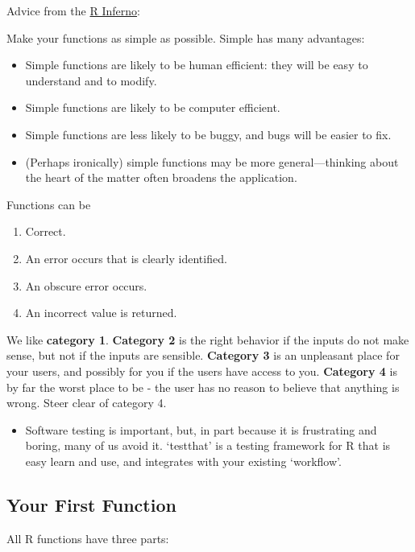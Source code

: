 \documentclass[]{book}
\providecommand{\tightlist}{%
  \setlength{\itemsep}{0pt}\setlength{\parskip}{0pt}}
\newenvironment{rmdblock}[1]
  {\begin{shaded*}
  \begin{itemize}
  \renewcommand{\labelitemi}{
    \raisebox{-.7\height}[0pt][0pt]{
      {\setkeys{Gin}{width=3em,keepaspectratio}\texttt{[image: images/\#1]}}
    }
  }
  \item
  }
  {
  \end{itemize}
  \end{shaded*}
  }
\newenvironment{rmdimportant}
  {\begin{rmdblock}{important}}
  {\end{rmdblock}}
\begin{document}
Advice from the
\href{http://www.burns-stat.com/pages/Tutor/R_inferno.pdf}{R Inferno}:

Make your functions as simple as possible. Simple has many advantages:

\begin{itemize}
\tightlist
\item
  Simple functions are likely to be human efficient: they will be easy
  to understand and to modify.
\item
  Simple functions are likely to be computer efficient.
\item
  Simple functions are less likely to be buggy, and bugs will be easier
  to fix.
\item
  (Perhaps ironically) simple functions may be more general---thinking
  about the heart of the matter often broadens the application.
\end{itemize}

Functions can be

\begin{enumerate}
\def\labelenumi{\arabic{enumi}.}
\tightlist
\item
  Correct.
\item
  An error occurs that is clearly identified.
\item
  An obscure error occurs.
\item
  An incorrect value is returned.
\end{enumerate}

We like \textbf{category 1}. \textbf{Category 2} is the right behavior
if the inputs do not make sense, but not if the inputs are sensible.
\textbf{Category 3} is an unpleasant place for your users, and possibly
for you if the users have access to you. \textbf{Category 4} is by far
the worst place to be - the user has no reason to believe that anything
is wrong. Steer clear of category 4.

\begin{rmdimportant}
Software testing is important, but, in part because it is frustrating
and boring, many of us avoid it. `testthat' is a testing framework for R
that is easy learn and use, and integrates with your existing
`workflow'.
\end{rmdimportant}

\subsection{Your First Function}\label{your-first-function}

All R functions have three parts:
\end{document}
